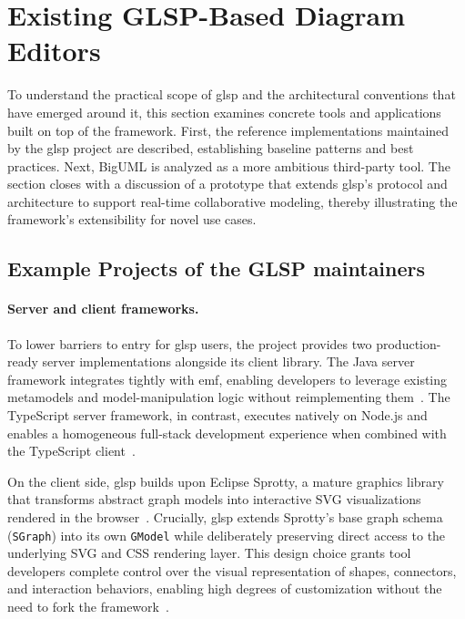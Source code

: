 \section{Existing GLSP-Based Diagram Editors}
\label{sec:sota_glsp}
 
To understand the practical scope of \gls{glsp} and the architectural conventions that have emerged around it, this section examines concrete tools and applications built on top of the framework.
First, the reference implementations maintained by the \gls{glsp} project are described, establishing baseline patterns and best practices.
Next, BigUML is analyzed as a more ambitious third-party tool.
The section closes with a discussion of a prototype that extends \gls{glsp}'s protocol and architecture to support real-time collaborative modeling, thereby illustrating the framework's extensibility for novel use cases.
 
\subsection{Example Projects of the GLSP maintainers}
\label{subsec:glsp_examples}
 
\paragraph{Server and client frameworks.}
To lower barriers to entry for \gls{glsp} users, the project provides two production-ready server implementations alongside its client library.
The Java server framework integrates tightly with \gls{emf}, enabling developers to leverage existing metamodels and model-manipulation logic without reimplementing them~\cite{noauthor_eclipse-glspglsp-server_2026}.
The TypeScript server framework, in contrast, executes natively on Node.js and enables a homogeneous full-stack development experience when combined with the TypeScript client~\cite{noauthor_eclipse-glspglsp-server-node_2026}.
 
On the client side, \gls{glsp} builds upon Eclipse Sprotty, a mature graphics library that transforms abstract graph models into interactive SVG visualizations rendered in the browser~\cite{noauthor_eclipse-sprottysprotty_2026}.
Crucially, \gls{glsp} extends Sprotty's base graph schema (\texttt{SGraph}) into its own \texttt{GModel} while deliberately preserving direct access to the underlying SVG and CSS rendering layer.
This design choice grants tool developers complete control over the visual representation of shapes, connectors, and interaction behaviors, enabling high degrees of customization without the need to fork the framework~\cite{bork_vision_2024}.
 
